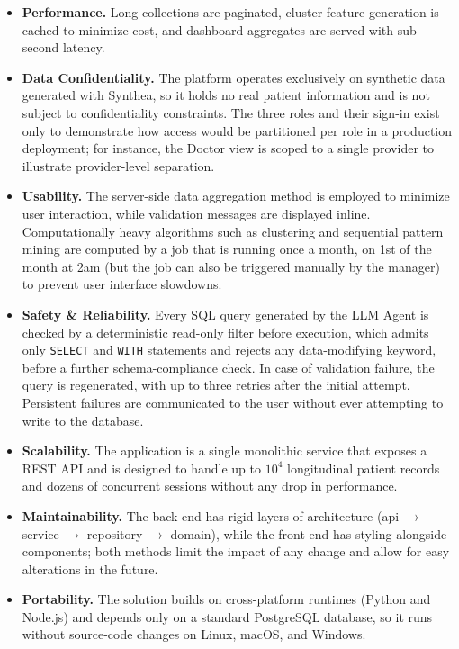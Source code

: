\begin{itemize}
    \item \textbf{Performance.} Long collections are paginated, cluster feature generation is cached to minimize cost, and dashboard aggregates are served with sub-second latency.
    \item \textbf{Data Confidentiality.} The platform operates exclusively on synthetic data generated with Synthea, so it holds no real patient information and is not subject to confidentiality constraints. The three roles and their sign-in exist only to demonstrate how access would be partitioned per role in a production deployment; for instance, the Doctor view is scoped to a single provider to illustrate provider-level separation.
    \item \textbf{Usability.} The server-side data aggregation method is employed to minimize user interaction, while validation messages are displayed inline. Computationally heavy algorithms such as clustering and sequential pattern mining are computed by a job that is running once a month, on 1st of the month at 2am (but the job can also be triggered manually by the manager) to prevent user interface slowdowns.
    \item \textbf{Safety \& Reliability.} Every SQL query generated by the LLM Agent is checked by a deterministic read-only filter before execution, which admits only \texttt{SELECT} and \texttt{WITH} statements and rejects any data-modifying keyword, before a further schema-compliance check. In case of validation failure, the query is regenerated, with up to three retries after the initial attempt. Persistent failures are communicated to the user without ever attempting to write to the database.
    \item \textbf{Scalability.} The application is a single monolithic service that exposes a REST API and is designed to handle up to $10^{4}$ longitudinal patient records and dozens of concurrent sessions without any drop in performance.
    \item \textbf{Maintainability.} The back-end has rigid layers of architecture (api $\rightarrow$ service $\rightarrow$ repository $\rightarrow$ domain), while the front-end has styling alongside components; both methods limit the impact of any change and allow for easy alterations in the future.
    \item \textbf{Portability.} The solution builds on cross-platform runtimes (Python and Node.js) and depends only on a standard PostgreSQL database, so it runs without source-code changes on Linux, macOS, and Windows.
\end{itemize}